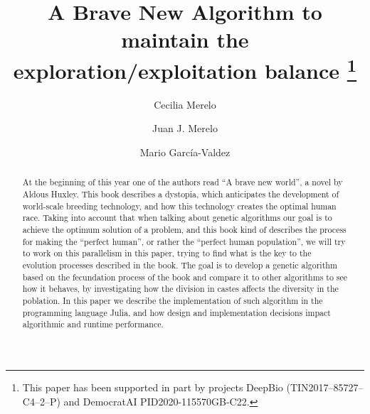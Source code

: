 \documentclass[runningheads]{llncs}
\begin{document}
%
\title{A {\sf Brave New Algorithm} to maintain the exploration/exploitation
  balance \thanks{This paper has been supported in part by projects DeepBio (TIN2017--85727--C4--2--P) and DemocratAI PID2020-115570GB-C22.}}
%
%
\author{Cecilia Merelo \and
Juan J. Merelo \and Mario Garc\'ia-Valdez
 }
%
%
%
\maketitle              %
%
\begin{abstract}

At the beginning of this year one of the authors read ``A brave new
world'', a novel by Aldous Huxley.  This book describes a dystopia,
which anticipates the development of world-scale breeding technology,
and how this technology creates the optimal human race. Taking into
account that when talking about genetic algorithms our goal is to
achieve the optimum solution of a problem, and this book kind of
describes the process for making the “perfect human”, or rather the
``perfect human population'', we will try to work on this parallelism
in this paper, trying to find what is the key to the evolution
processes described in the book. The goal is to develop a genetic
algorithm based on the fecundation process of the book and compare it
to other algorithms to see how it behaves, by investigating how the
division in castes affects the diversity in the poblation. In this
paper we describe the implementation of such algorithm in the
programming language Julia, and how design and implementation
decisions impact algorithmic and runtime performance.

\end{abstract}










\end{document}
